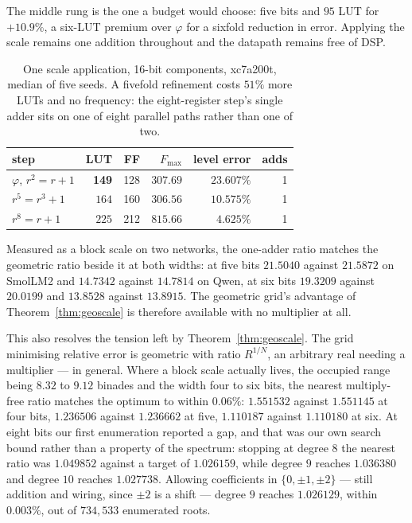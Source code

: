 The middle rung is the one a budget would choose: five bits and $95$ LUT for
$+10.9\%$, a six-LUT premium over $\varphi$ for a sixfold reduction in error.
Applying the scale remains one addition throughout and the datapath remains free
of DSP.

\begin{table}[t]\centering
\caption{One scale application, 16-bit components, xc7a200t, median of five
seeds. A fivefold refinement costs $51\%$ more LUTs and no frequency: the
eight-register step's single adder sits on one of eight parallel paths rather
than one of two.}
\label{tab:oneadder}
\begin{tabular}{lrrrrr}
\toprule
step & LUT & FF & $F_{\max}$ & level error & adds \\
\midrule
$\varphi$, $r^2=r+1$   & \textbf{149} & 128 & $307.69$ & $23.607\%$ & 1 \\
$r^5=r^3+1$            & $164$ & 160 & $306.56$ & $10.575\%$ & 1 \\
$r^8=r+1$              & $225$ & 212 & $\mathbf{815.66}$ & $\mathbf{4.625\%}$ & 1 \\
\bottomrule
\end{tabular}
\end{table}

Measured as a block scale on two networks, the one-adder ratio matches the
geometric ratio beside it at both widths: at five bits $21.5040$ against
$21.5872$ on SmolLM2 and $14.7342$ against $14.7814$ on Qwen, at six bits
$19.3209$ against $20.0199$ and $13.8528$ against $13.8915$. The geometric
grid's advantage of Theorem~\ref{thm:geoscale} is therefore available with no
multiplier at all.

This also resolves the tension left by Theorem~\ref{thm:geoscale}. The grid
minimising relative error is geometric with ratio $R^{1/N}$, an arbitrary real
needing a multiplier --- in general. Where a block scale actually lives, the
occupied range being $8.32$ to $9.12$ binades and the width four to six bits,
the nearest multiply-free ratio matches the optimum to within $0.06\%$:
$1.551532$ against $1.551145$ at four bits, $1.236506$ against $1.236662$ at
five, $1.110187$ against $1.110180$ at six. At eight bits our first enumeration reported a gap, and that was our own search
bound rather than a property of the spectrum: stopping at degree $8$ the nearest
ratio was $1.049852$ against a target of $1.026159$, while degree $9$ reaches
$1.036380$ and degree $10$ reaches $1.027738$. Allowing coefficients in
$\{0,\pm1,\pm2\}$ --- still addition and wiring, since $\pm2$ is a shift ---
degree $9$ reaches $1.026129$, within $0.003\%$, out of $734{,}533$ enumerated
roots.

